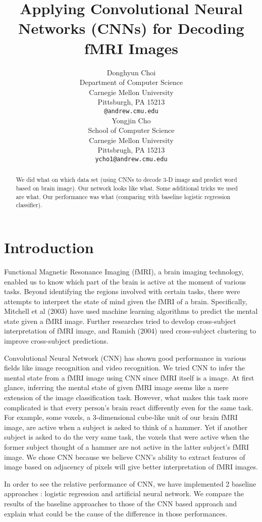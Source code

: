 \documentclass{article} %
\title{Applying Convolutional Neural Networks (CNNs) for Decoding fMRI Images}
\author{
Donghyun Choi \\
Department of Computer Science\\
Carnegie Mellon University\\
Pittsburgh, PA 15213 \\
\texttt{@andrew.cmu.edu} \\
\And
Yongjin Cho \\
School of Computer Science \\
Carnegie Mellon University \\
Pittsbrugh, PA 15213\\
\texttt{ycho1@andrew.cmu.edu} \\
}
\begin{document}
\maketitle

\begin{abstract}
We did what on which data set (using CNNs to decode 3-D image and predict word based on brain image). Our network looks like what. Some additional tricks we used are what. Our performance was what (comparing with baseline logistic regression classifier).
\end{abstract}

\section{Introduction}

Functional Magnetic Resonance Imaging (fMRI), a brain imaging technology, enabled us to know which part of the brain is active at the moment of various tasks. Beyond identifying the regions involved with certain tasks, there were attempts to interpret the state of mind given the fMRI of a brain. Specifically, Mitchell et al (2003) have used machine learning algorithms to predict the mental state given a fMRI image. Further researches tried to develop cross-subject interpretation of fMRI image, and Ramish (2004) used cross-subject clustering to improve cross-subject predictions.

Convolutional Neural Network (CNN) has shown good performance in various fields like image recognition and video recognition. We tried CNN to infer the mental state from a fMRI image using CNN since fMRI itself is a image. At first glance, inferring the mental state of given fMRI image seems like a mere extension of the image classification task. However, what makes this task more complicated is that every person's brain react differently even for the same task. For example, some voxels, a 3-dimensional cube-like unit of our brain fMRI image, are active when a subject is asked to think of a hammer. Yet if another subject is asked to do the very same task, the voxels that were active when the former subject thought of a hammer are not active in the latter subject's fMRI image. We chose CNN because we believe CNN's ability to extract features of image based on adjacency of pixels will give better interpretation of fMRI images.  

In order to see the relative performance of CNN, we have implemented 2 baseline approaches : logistic regression and artificial neural network. We compare the results of the baseline approaches to those of the CNN based approach and explain what could be the cause of the difference in those performances. 
\end{document}

